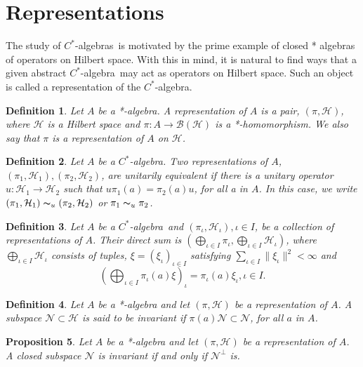 \documentclass{book}
\newtheorem{definition}{Definition}[section]
\newtheorem{proposition}[definition]{Proposition}
\def\cstar{\(C^*\)-algebra}
\def\cstars{\(C^*\)-algebras}
\begin{document}
\section{Representations}
The study of \cstars\ is motivated by the prime example of closed * algebras 
of operators on Hilbert space. With this in mind, it is natural to
find ways that a given abstract \cstar\ may act as operators on Hilbert
space. Such an object is called a representation of the \cstar.
\begin{definition}
  Let \(A\) be a *-algebra. A \textnormal{representation} of \(A\) is a pair,
  \((\pi, \mathcal{H})\), where \(\mathcal{H}\) is a Hilbert space and \(\pi : A \rightarrow \mathcal{B}(\mathcal{H})\) 
  is a *-homomorphism.
  We also say that \(\pi\) is a representation of \(A\) on \(\mathcal{H}\).
\end{definition}
\begin{definition}
  Let \(A\) be a \cstar. Two representations of \(A\),
  \((\pi_1, \mathcal{H}_1),(\pi_2,\mathcal{H}_2)\), are \textnormal{unitarily equivalent} if there is a unitary operator \(u :
  \mathcal{H}_1 \rightarrow \mathcal{H}_2\) such that \(u\pi_1(a) = \pi_2(a)u\), for all a in \(A\). In this case, we write
  \((\pi_1, \mathcal{H}_1) \thicksim_u (\pi_2,\mathcal{H}_2)\) or \(\pi_1 \thicksim_u \pi_2\).
\end{definition}
\begin{definition}
  Let \(A\) be a \cstar\ and \((\pi_\iota,\mathcal{H}_\iota),\iota \in I\), be a collection
  of representations of \(A\). Their \textnormal{direct sum} is \((\bigoplus_{\iota\in I}\pi_\iota,\bigoplus_{\iota\in I}\mathcal{H}_\iota)\), 
  where \(\bigoplus_{\iota\in I}\mathcal{H}_\iota\)
  consists of tuples, \(\xi = (\xi_\iota)_{\iota\in I}\) satisfying \(\sum_{\iota\in I} \|\xi_\iota\|^2 < \infty\) and
  \[
  {\left(\bigoplus_{\iota\in I}\pi_\iota(a)\xi\right)}_\iota = \pi_\iota(a)\xi_\iota,\iota \in I.
  \]
\end{definition}
\begin{definition}
  Let \(A\) be a *-algebra and let \((\pi,\mathcal{H})\) be a representation
  of \(A\). A subspace \(\mathcal{N} \subset \mathcal{H}\) is said to be \textnormal{invariant} if \(\pi(a)\mathcal{N} \subset \mathcal{N}\), 
  for all \(a\) in \(A\).
\end{definition}
\begin{proposition}\label{prop:1115}
  Let \(A\) be a *-algebra and let \((\pi,\mathcal{H})\) be a representation
  of \(A\). A closed subspace \(\mathcal{N}\) is invariant if and only if \(\mathcal{N}^\bot\) is.
\end{proposition}
\end{document}
